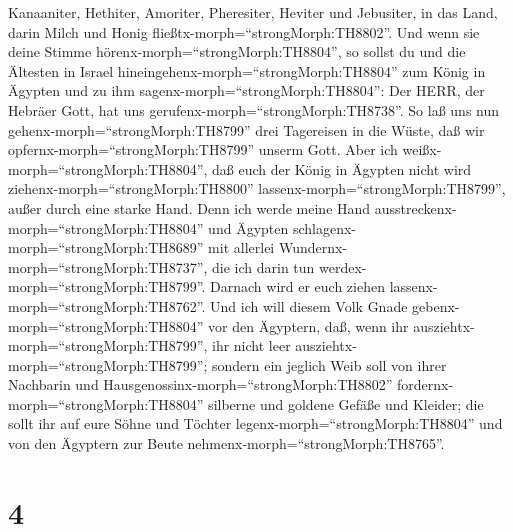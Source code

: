Kanaaniter, Hethiter, Amoriter, Pheresiter, Heviter und Jebusiter, in
das Land, darin Milch und Honig fließtx-morph=``strongMorph:TH8802''.
 Und wenn sie deine Stimme
hörenx-morph=``strongMorph:TH8804'', so sollst du und die Ältesten in
Israel hineingehenx-morph=``strongMorph:TH8804'' zum König in Ägypten
und zu ihm sagenx-morph=``strongMorph:TH8804'': Der HERR, der Hebräer
Gott, hat uns gerufenx-morph=``strongMorph:TH8738''. So laß uns nun
gehenx-morph=``strongMorph:TH8799'' drei Tagereisen in die Wüste, daß
wir opfernx-morph=``strongMorph:TH8799'' unserm Gott.  Aber
ich weißx-morph=``strongMorph:TH8804'', daß euch der König in Ägypten
nicht wird ziehenx-morph=``strongMorph:TH8800''
lassenx-morph=``strongMorph:TH8799'', außer durch eine starke Hand.
 Denn ich werde meine Hand
ausstreckenx-morph=``strongMorph:TH8804'' und Ägypten
schlagenx-morph=``strongMorph:TH8689'' mit allerlei
Wundernx-morph=``strongMorph:TH8737'', die ich darin tun
werdex-morph=``strongMorph:TH8799''. Darnach wird er euch ziehen
lassenx-morph=``strongMorph:TH8762''.  Und ich will diesem
Volk Gnade gebenx-morph=``strongMorph:TH8804'' vor den Ägyptern, daß,
wenn ihr ausziehtx-morph=``strongMorph:TH8799'', ihr nicht leer
ausziehtx-morph=``strongMorph:TH8799'';  sondern ein
jeglich Weib soll von ihrer Nachbarin und
Hausgenossinx-morph=``strongMorph:TH8802''
fordernx-morph=``strongMorph:TH8804'' silberne und goldene Gefäße und
Kleider; die sollt ihr auf eure Söhne und Töchter
legenx-morph=``strongMorph:TH8804'' und von den Ägyptern zur Beute
nehmenx-morph=``strongMorph:TH8765''.

\hypertarget{section-3}{%
\section{4}\label{section-3}}


